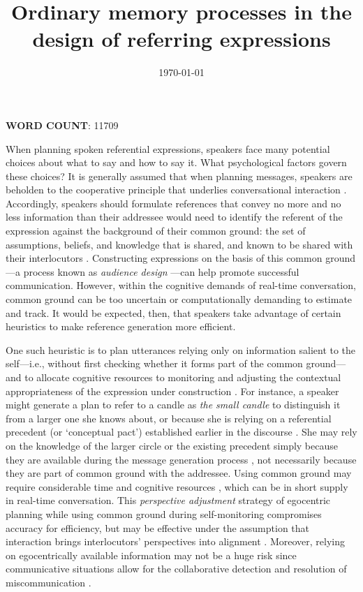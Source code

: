 \documentclass[natbib,doc,a4paper]{apa6}
\date{\today}
\title{Ordinary memory processes in the design of referring expressions}
\begin{document}
\maketitle
\begin{center}
\textbf{WORD COUNT}: 11709
\end{center}

When planning spoken referential expressions, speakers face many potential choices about what to say and how to say it. What psychological factors govern these choices? It is generally assumed that when planning messages, speakers are beholden to the cooperative principle that underlies conversational interaction \citep{grice75}. Accordingly, speakers should formulate references that convey no more and no less information than their addressee would need to identify the referent of the expression against the background of their common ground: the set of assumptions, beliefs, and knowledge that is shared, and known to be shared with their interlocutors \citep{clarkmarshall81}. Constructing expressions on the basis of this common ground---a process known as \emph{audience design} \citep{clarkmurphy82}---can help promote successful communication.  However, within the cognitive demands of real-time conversation, common ground can be too uncertain or computationally demanding to estimate and track.  It would be expected, then, that speakers take advantage of certain heuristics to make reference generation more efficient.

One such heuristic is to plan utterances relying only on information salient to the self---i.e., without first checking whether it forms part of the common ground---and to allocate cognitive resources to monitoring and adjusting the contextual appropriateness of the expression under construction \citep{hortonkeysar96}.  For instance, a speaker might generate a plan to refer to a candle as \emph{the small candle} to distinguish it from a larger one she knows about, or because she is relying on a referential precedent (or `conceptual pact') established earlier in the discourse \citep{brennanclark96}.  She may rely on the knowledge of the larger circle or the existing precedent simply because they are available during the message generation process \citep{DellBrown1991}, not necessarily because they are part of common ground with the addressee.  Using common ground may require considerable time and cognitive resources \citep{hortonkeysar96,rossnagel00}, which can be in short supply in real-time conversation. This \emph{perspective adjustment} strategy of egocentric planning while using common ground during self-monitoring \citep{hortonkeysar96} compromises accuracy for efficiency, but may be effective under the assumption that interaction brings interlocutors' perspectives into alignment \citep{pickeringgarrod04}. Moreover, relying on egocentrically available information may not be a huge risk since communicative situations allow for the collaborative detection and resolution of miscommunication \citep{fussellkrauss92}.  
\end{document}
